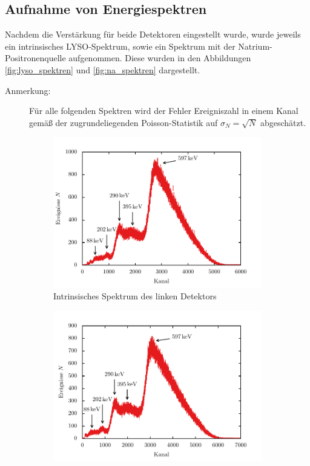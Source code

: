 \documentclass[11pt, a4paper]{article}
\numberwithin{equation}{section}
\begin{document}
\subsection{Aufnahme von Energiespektren}
Nachdem die Verstärkung für beide Detektoren eingestellt wurde, wurde jeweils ein intrinsisches LYSO-Spektrum, sowie ein Spektrum mit der Natrium-Positronenquelle aufgenommen.
Diese wurden in den Abbildungen \ref{fig:lyso_spektren} und \ref{fig:na_spektren} dargestellt.
\begin{description}
	\item[Anmerkung:] Für alle folgenden Spektren wird der Fehler Ereigniszahl in einem Kanal gemäß der zugrundeliegenden Poisson-Statistik auf $\sigma_N = \sqrt{N}$ abgeschätzt.
\end{description}
\begin{figure}[htbp]
	\centering
	\begin{subfigure}{\textwidth}
		\centering
		\includegraphics[width=\textwidth]{./figures/LYSO_links}
		\caption{Intrinsisches Spektrum des linken Detektors}
	\end{subfigure}
	\begin{subfigure}{\textwidth}
		\centering
		\includegraphics[width=\textwidth]{./figures/LYSO_rechts}

\end{subfigure}
\end{figure}
\end{document}
